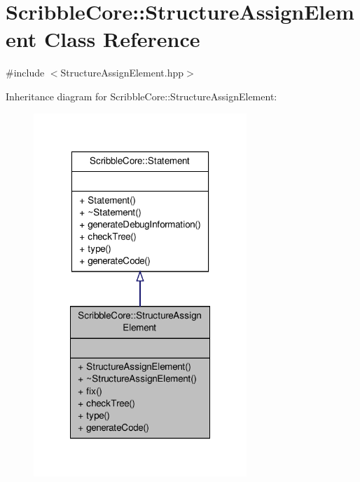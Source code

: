 \hypertarget{class_scribble_core_1_1_structure_assign_element}{\section{Scribble\-Core\-:\-:Structure\-Assign\-Element Class Reference}
\label{class_scribble_core_1_1_structure_assign_element}
}


{\ttfamily \#include $<$Structure\-Assign\-Element.\-hpp$>$}



Inheritance diagram for Scribble\-Core\-:\-:Structure\-Assign\-Element\-:
\nopagebreak
\begin{figure}[H]
\begin{center}
\leavevmode
\includegraphics[width=228pt]{class_scribble_core_1_1_structure_assign_element__inherit__graph}
\end{center}
\end{figure}


